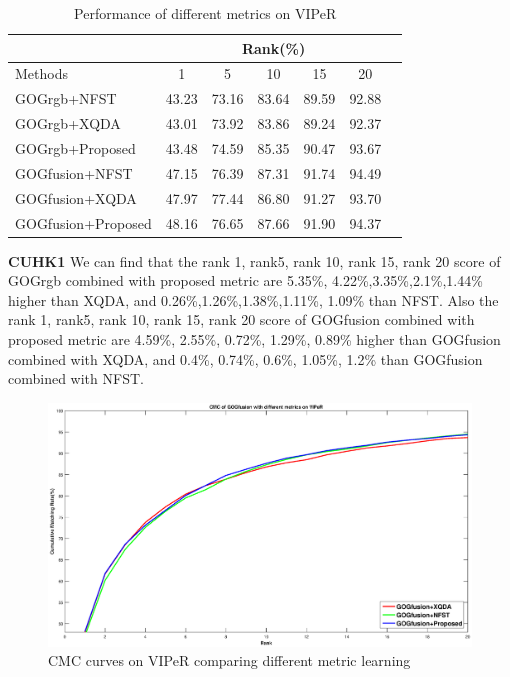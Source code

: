 \documentclass[conference,compsoc]{IEEEtran}
\begin{document}
\begin{table}[H]
\caption{Performance of different metrics on VIPeR}
\centering
 \begin{tabular}{|l|c|c|c|c|c|c|}
\hline
& \multicolumn{5}{|c|}{Rank(\%)} \\
\hline
Methods& 1 & 5 &10& 15&20\\
\hline
GOGrgb+NFST& 43.23&73.16 &83.64 & 89.59&92.88\\  
\hline
GOGrgb+XQDA& 43.01&73.92&83.86& 89.24& 92.37\\
\hline
GOGrgb+Proposed&43.48&74.59&85.35&90.47&93.67\\   %
\hline
GOGfusion+NFST&47.15& 76.39&87.31&91.74&94.49\\
\hline
GOGfusion+XQDA& 47.97& 77.44& 86.80& 91.27&93.70\\  
\hline
GOGfusion+Proposed&48.16& 76.65&87.66&91.90&94.37\\ %

\hline

\end{tabular}
\end{table}
\textbf{CUHK1} We can find that the rank 1, rank5, rank 10, rank 15, rank 20 score of GOGrgb combined with proposed metric are 5.35\%, 4.22\%,3.35\%,2.1\%,1.44\% higher than XQDA, and 0.26\%,1.26\%,1.38\%,1.11\%, 1.09\% than NFST.  Also the  rank 1, rank5, rank 10, rank 15, rank 20 score of GOGfusion combined with proposed metric are 4.59\%, 2.55\%, 0.72\%, 1.29\%, 0.89\% higher than GOGfusion combined with XQDA, and 0.4\%, 0.74\%, 0.6\%, 1.05\%, 1.2\% than GOGfusion combined with NFST. 

\begin{figure}
\begin{raggedleft}
\includegraphics[width=1\linewidth]{VIPeR.eps}
\vspace{-3em}
\caption{CMC curves on VIPeR comparing different metric learning}
\end{raggedleft}
\end{figure}
\end{document}
